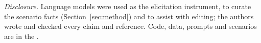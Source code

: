 \emph{Disclosure.} Language models were used as the elicitation instrument, to curate the scenario facts (Section~\ref{sec:method}) and to assist with editing; the authors wrote and checked every claim and reference. Code, data, prompts and scenarios are in the \anonlink.

